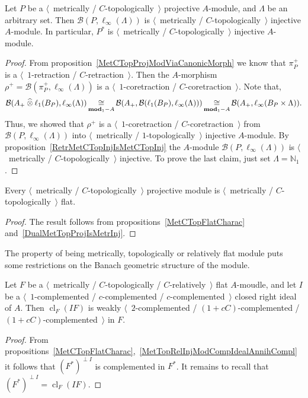\begin{proposition}\label{DualMetTopProjIsMetrInj} Let $P$ be a
$\langle$~metrically / $C$-topologically~$\rangle$ projective $A$-module, and
$\Lambda$ be an arbitrary set. Then $\mathcal{B}(P,\ell_\infty(\Lambda))$ is
$\langle$~metrically / $C$-topologically~$\rangle$ injective $A$-module. In
particular, $P^*$ is $\langle$~metrically / $C$-topologically~$\rangle$
injective $A$-module.
\end{proposition}
\begin{proof} From proposition~\ref{MetCTopProjModViaCanonicMorph} we know 
that $\pi_P^+$ is a $\langle$~$1$-retraction / $C$-retraction~$\rangle$. 
Then the $A$-morphism
$\rho^+=\mathcal{B}(\pi_P^+,\ell_\infty(\Lambda))$ is a
$\langle$~$1$-coretraction / $C$-coretraction~$\rangle$. Note that, 
$$
\mathcal{B}(A_+\mathbin{\widehat{\otimes}}\ell_1(B_P),\ell_\infty(\Lambda))
\mathop{\mathbin{\cong}}\limits_{\mathbf{mod}_1-A}
\mathcal{B}(A_+,\mathcal{B}(\ell_1(B_P),\ell_\infty(\Lambda)))
\mathop{\mathbin{\cong}}\limits_{\mathbf{mod}_1-A}
\mathcal{B}(A_+,\ell_\infty(B_P\times\Lambda)).
$$ 
Thus, we showed that $\rho^+$ is a $\langle$~$1$-coretraction /
$C$-coretraction~$\rangle$ from $\mathcal{B}(P,\ell_\infty(\Lambda))$ into
$\langle$~metrically / $1$-topologically~$\rangle$ injective $A$-module. By
proposition~\ref{RetrMetCTopInjIsMetCTopInj} the $A$-module
$\mathcal{B}(P,\ell_\infty(\Lambda))$ is $\langle$~metrically /
$C$-topologically~$\rangle$ injective. To prove the last claim, just set
$\Lambda=\mathbb{N}_1$.
\end{proof}

\begin{proposition}\label{MetTopProjIsMetTopFlat} Every $\langle$~metrically /
$C$-topologically~$\rangle$ projective module is $\langle$~metrically /
$C$-topologically~$\rangle$ flat.
\end{proposition}
\begin{proof} The result follows from propositions~\ref{MetCTopFlatCharac}
and~\ref{DualMetTopProjIsMetrInj}.
\end{proof}

The property of being metrically, topologically or relatively flat module 
puts some restrictions on the Banach geometric structure of the module.

\begin{proposition}\label{MetTopRelFlatModCompIdealPartCompl} Let $F$ 
be a $\langle$~metrically / $C$-topologically / $C$-relatively~$\rangle$ 
flat $A$-moudle, and let $I$ 
be a $\langle$~$1$-complemented / $c$-complemented / $c$-complemented~$\rangle$
closed right ideal of $A$. Then $\operatorname{cl}_F(I F)$ 
is weakly $\langle$~$2$-complemented / $(1+cC)$-complemented / 
$(1+cC)$-complemented~$\rangle$  in $F$.
\end{proposition}
\begin{proof} From 
propositions~\ref{MetCTopFlatCharac},~\ref{MetTopRelInjModCompIdealAnnihCompl} 
it follows that ${(F^*)}^{\perp I}$ is complemented in $F^*$. It remains to 
recall that ${(F^*)}^{\perp I}=\operatorname{cl}_F(I F)$. 
\end{proof}

